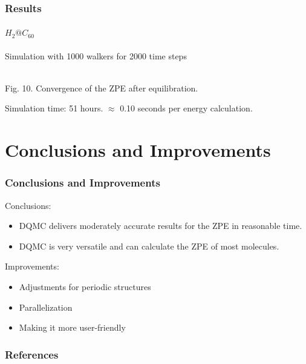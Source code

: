 \documentclass{beamer}
\begin{document}
\begin{frame}
\frametitle{Results}
\framesubtitle{$H_2@C_{60}$}
Simulation with 1000 walkers for 2000 time steps
\begin{center}
\\
Fig. 10. Convergence of the ZPE after equilibration.
\end{center}
Simulation time: 51 hours. $\approx$ 0.10 seconds per energy calculation.
\end{frame}

\section{Conclusions and Improvements}
\begin{frame}
\frametitle{Conclusions and Improvements}
Conclusions:
\begin{itemize}
\item DQMC delivers moderately accurate results for the ZPE in reasonable time.
\item DQMC is very versatile and can calculate the ZPE of most molecules.
\end{itemize}
Improvements:
\begin{itemize}
\item Adjustments for periodic structures
\item Parallelization
\item Making it more user-friendly
\end{itemize}
\end{frame}


\begin{frame}
\frametitle{References}

\begin{scriptsize}

\end{scriptsize}
\end{frame}
\end{document}
